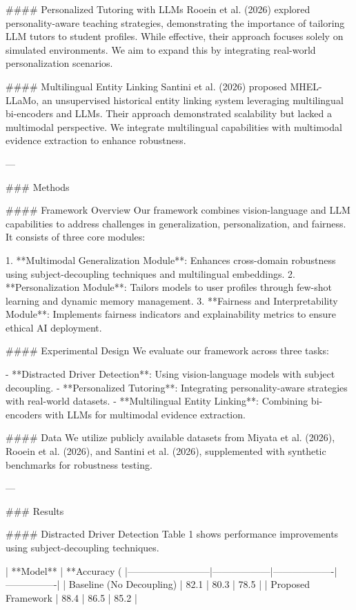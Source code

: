 #### Personalized Tutoring with LLMs  
Rooein et al. (2026) explored personality-aware teaching strategies, demonstrating the importance of tailoring LLM tutors to student profiles. While effective, their approach focuses solely on simulated environments. We aim to expand this by integrating real-world personalization scenarios.

#### Multilingual Entity Linking  
Santini et al. (2026) proposed MHEL-LLaMo, an unsupervised historical entity linking system leveraging multilingual bi-encoders and LLMs. Their approach demonstrated scalability but lacked a multimodal perspective. We integrate multilingual capabilities with multimodal evidence extraction to enhance robustness.

---

### Methods  

#### Framework Overview  
Our framework combines vision-language and LLM capabilities to address challenges in generalization, personalization, and fairness. It consists of three core modules:  

1. **Multimodal Generalization Module**: Enhances cross-domain robustness using subject-decoupling techniques and multilingual embeddings.  
2. **Personalization Module**: Tailors models to user profiles through few-shot learning and dynamic memory management.  
3. **Fairness and Interpretability Module**: Implements fairness indicators and explainability metrics to ensure ethical AI deployment.  

#### Experimental Design  
We evaluate our framework across three tasks:  

- **Distracted Driver Detection**: Using vision-language models with subject decoupling.  
- **Personalized Tutoring**: Integrating personality-aware strategies with real-world datasets.  
- **Multilingual Entity Linking**: Combining bi-encoders with LLMs for multimodal evidence extraction.  

#### Data  
We utilize publicly available datasets from Miyata et al. (2026), Rooein et al. (2026), and Santini et al. (2026), supplemented with synthetic benchmarks for robustness testing.

---

### Results  

#### Distracted Driver Detection  
Table 1 shows performance improvements using subject-decoupling techniques.

| **Model**                | **Accuracy (%
|--------------------------|------------------|-------------------|----------------|
| Baseline (No Decoupling) | 82.1             | 80.3              | 78.5           |
| Proposed Framework       | 88.4             | 86.5              | 85.2           |

